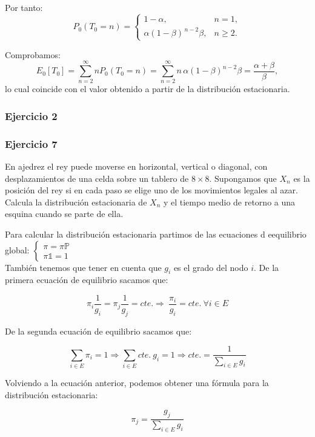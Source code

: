 Por tanto:
\[
P_0(T_0=n)=
\begin{cases}
1-\alpha, & n=1,\\[4pt]
\alpha(1-\beta)^{\,n-2}\beta, & n\ge2.
\end{cases}
\]

Comprobamos:
\[
E_0[T_0] = \sum_{n=2}^{\infty} n P_0(T_0=n)
= \sum_{n=2}^{\infty} n\, \alpha(1-\beta)^{n-2}\beta
= \frac{\alpha+\beta}{\beta},
\]
lo cual coincide con el valor obtenido a partir de la distribución estacionaria.



\subsubsection{Ejercicio 2}
\subsubsection{Ejercicio 7}

\begin{exercise}
    En ajedrez el rey puede moverse en horizontal, vertical o diagonal, con desplazamientos de una celda sobre un tablero de $8\times 8$. Supongamos que $X_n$ es la posición del rey si en cada paso se elige uno de los movimientos legales al azar.  Calcula la distribución estacionaria de $X_n$ y el tiempo medio de retorno a una esquina cuando se parte de ella.
\end{exercise}

Para calcular la distribución estacionaria partimos de las ecuaciones d eequilibrio global: $\left\{\begin{array}{l}
    \pi=\pi\mathbb{P}\\
    \pi\mathds{1}=1
\end{array}\right.$\\

También tenemos que tener en cuenta que $g_i$ es el grado del nodo $i$. De la primera ecuación de equilibrio sacamos que:

$$
\pi_i\frac{1}{g_i}=\pi_j\frac{1}{g_j}=cte.\Rightarrow\ \frac{\pi_i}{g_i}=cte.\ \forall i\in E
$$

De la segunda ecuación de equilibrio sacamos que:

$$
\sum_{i\in E}\pi_i=1\Rightarrow\sum_{i\in E}cte.\ g_i=1\Rightarrow cte.=\frac{1}{\sum_{i\in E}g_i}
$$

Volviendo a la ecuación anterior, podemos obtener una fórmula para la distribución estacionaria:

$$
\pi_j=\frac{g_j}{\sum_{i\in E}g_i}
$$

